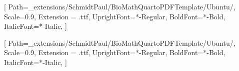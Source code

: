 \setsansfont{Ubuntu}[
    Path=_extensions/SchmidtPaul/BioMathQuartoPDFTemplate/Ubuntu/,
    Scale=0.9,
    Extension = .ttf,
    UprightFont=*-Regular,
    BoldFont=*-Bold,
    ItalicFont=*-Italic,
    ]

\setmainfont{Ubuntu}[
    Path=_extensions/SchmidtPaul/BioMathQuartoPDFTemplate/Ubuntu/,
    Scale=0.9,
    Extension = .ttf,
    UprightFont=*-Regular,
    BoldFont=*-Bold,
    ItalicFont=*-Italic,
    ]

